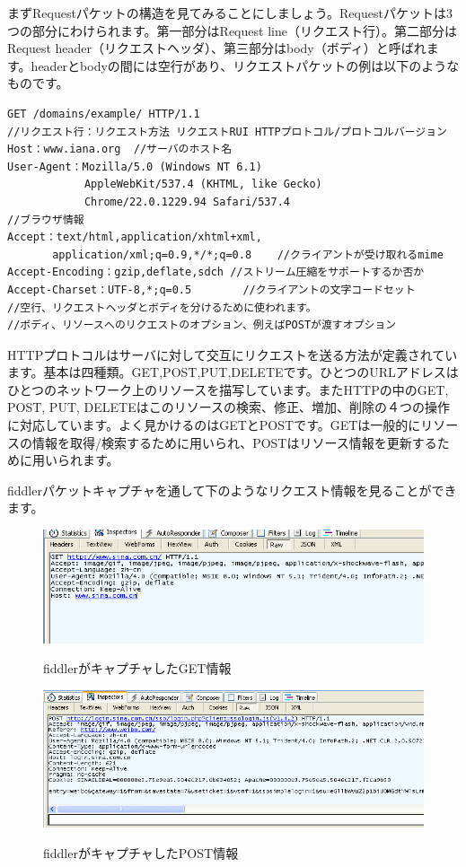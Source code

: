 まずRequestパケットの構造を見てみることにしましょう。Requestパケットは3つの部分にわけられます。第一部分はRequest line（リクエスト行）。第二部分はRequest header（リクエストヘッダ）、第三部分はbody（ボディ）と呼ばれます。headerとbodyの間には空行があり、リクエストパケットの例は以下のようなものです。

\begin{lstlisting}[numbers=none]
GET /domains/example/ HTTP/1.1
//リクエスト行：リクエスト方法 リクエストRUI HTTPプロトコル/プロトコルバージョン
Host：www.iana.org  //サーバのホスト名
User-Agent：Mozilla/5.0 (Windows NT 6.1)
            AppleWebKit/537.4 (KHTML, like Gecko)
            Chrome/22.0.1229.94 Safari/537.4
//ブラウザ情報
Accept：text/html,application/xhtml+xml,
       application/xml;q=0.9,*/*;q=0.8    //クライアントが受け取れるmime
Accept-Encoding：gzip,deflate,sdch //ストリーム圧縮をサポートするか否か
Accept-Charset：UTF-8,*;q=0.5        //クライアントの文字コードセット
//空行、リクエストヘッダとボディを分けるために使われます。
//ボディ、リソースへのリクエストのオプション、例えばPOSTが渡すオプション
\end{lstlisting}

HTTPプロトコルはサーバに対して交互にリクエストを送る方法が定義されています。基本は四種類。GET,POST,PUT,DELETEです。ひとつのURLアドレスはひとつのネットワーク上のリソースを描写しています。またHTTPの中のGET, POST, PUT, DELETEはこのリソースの検索、修正、増加、削除の４つの操作に対応しています。よく見かけるのはGETとPOSTです。GETは一般的にリソースの情報を取得/検索するために用いられ、POSTはリソース情報を更新するために用いられます。

fiddlerパケットキャプチャを通して下のようなリクエスト情報を見ることができます。

\begin{figure}[H]
  \includegraphics[width=14cm]{3.1.http.png}
   \label{図3.4}
   \caption{fiddlerがキャプチャしたGET情報}
\end{figure}


\begin{figure}[H]
  \includegraphics[width=14cm]{3.1.httpPOST.png}
   \label{図3.5}
   \caption{fiddlerがキャプチャしたPOST情報}
\end{figure}

